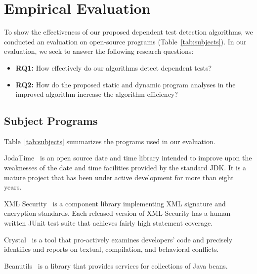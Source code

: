 \section{Empirical Evaluation}
\label{sec:evaluation}

To show the effectiveness of our proposed
dependent test detection algorithms, we conducted
an evaluation on  open-source programs (Table~\ref{tab:subjects}).
In our evaluation, we seek to answer the following research questions:

\begin{itemize}
\item \textbf{RQ1:} How effectively do our algorithms detect
dependent tests?
\item \textbf{RQ2:} How do the proposed static and dynamic program analyses
in the improved algorithm increase the algorithm efficiency?
\end{itemize}


\subsection{Subject Programs}




Table~\ref{tab:subjects} summarizes the programs used in our evaluation.

JodaTime~\cite{jodatime} is an open source
date and time library intended to improve upon the weaknesses of the
date and time facilities provided by the standard JDK.
It is a mature project that has been under active development
for more than eight years.

XML Security~\cite{xmlsecurity}
is a component library implementing XML signature and encryption
standards. Each released
version of XML Security has a human-written JUnit test suite that
achieves fairly high statement coverage.


Crystal~\cite{crystal} is a tool that
pro-actively examines developers' code and precisely identifies and reports on textual, compilation, and behavioral conflicts.

Beanutils~\cite{beanutils}
is a library that provides services for collections of
Java beans. 


